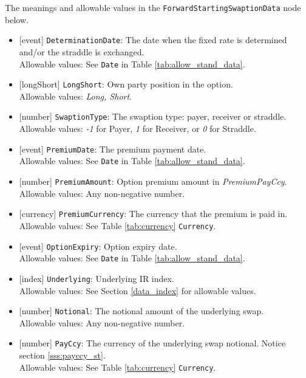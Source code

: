 The meanings and allowable values in the \lstinline!ForwardStartingSwaptionData! node below.

\begin{itemize}
  \item{}[event] \lstinline!DeterminationDate!: The date when the fixed rate is determined and/or the straddle is exchanged. \\
  Allowable values: See \lstinline!Date! in Table \ref{tab:allow_stand_data}.
  \item{}[longShort] \lstinline!LongShort!: Own party position in the option. \\
  Allowable values: \emph{Long, Short}.
  \item{}[number] \lstinline!SwaptionType!: The swaption type: payer, receiver or straddle. \\
  Allowable values: \emph{-1} for Payer, \emph{1} for Receiver, or \emph{0} for Straddle.
  \item{}[event] \lstinline!PremiumDate!: The premium payment date. \\
  Allowable values: See \lstinline!Date! in Table \ref{tab:allow_stand_data}.
  \item{}[number] \lstinline!PremiumAmount!: Option premium amount in \emph{PremiumPayCcy}. \\
  Allowable values: Any non-negative number.
  \item{}[currency] \lstinline!PremiumCurrency!: The currency that the premium is paid in. \\
  Allowable values: See Table \ref{tab:currency} \lstinline!Currency!.
  \item{}[event] \lstinline!OptionExpiry!: Option expiry date. \\
  Allowable values: See \lstinline!Date! in Table \ref{tab:allow_stand_data}. \\
  \item{}[index] \lstinline!Underlying!: Underlying IR index. \\
  Allowable values: See Section \ref{data_index} for allowable values.
  \item{}[number] \lstinline!Notional!: The notional amount of the underlying swap. \\
  Allowable values: Any non-negative number.
  \item{}[number] \lstinline!PayCcy!: The currency of the underlying swap notional. Notice section \ref{sss:payccy_st}. \\
  Allowable values: See Table \ref{tab:currency} \lstinline!Currency!.

\end{itemize}
